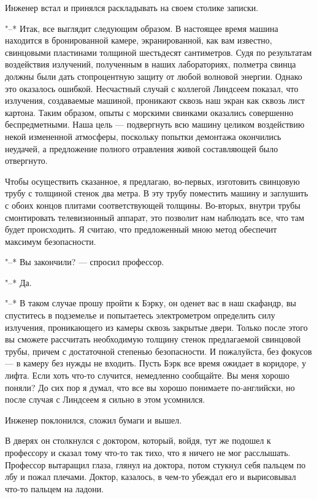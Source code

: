Инженер встал и принялся раскладывать на своем столике записки.

"--* Итак, все  выглядит  следующим  образом.  В  настоящее  время  машина
находится  в  бронированной  камере,  экранированной,  как  вам  известно,
свинцовыми пластинами толщиной шестьдесят сантиметров. Судя по результатам
воздействия излучений, полученным в наших  лабораториях,  полметра  свинца
должны были дать стопроцентную защиту от любой  волновой  энергии.  Однако
это оказалось ошибкой. Несчастный случай с коллегой Линдсеем показал,  что
излучения, создаваемые машиной, проникают сквозь наш экран как сквозь лист
картона. Таким образом, опыты с  морскими  свинками  оказались  совершенно
беспредметными. Наша цель --- подвергнуть  всю  машину  целиком  воздействию
некой  измененной  атмосферы,  поскольку  попытки   демонтажа   окончились
неудачей,  а  предложение  полного  отравления  живой  составляющей   было
отвергнуто.

Чтобы  осуществить  сказанное,  я  предлагаю,   во-первых,   изготовить
свинцовую трубу с толщиной стенок два метра. В эту трубу поместить  машину
и заглушить с обоих концов  плитами  соответствующей  толщины.  Во-вторых,
внутри  трубы  смонтировать  телевизионный  аппарат,  это   позволит   нам
наблюдать все, что там будет происходить. Я считаю, что предложенный  мною
метод обеспечит максимум безопасности.

"--* Вы закончили? --- спросил профессор.

"--* Да.

"--* В таком случае прошу пройти к Бэрку, он оденет вас в наш скафандр, вы
спуститесь  в  подземелье  и  попытаетесь  электрометром  определить  силу
излучения, проникающего из камеры  сквозь  закрытые  двери.  Только  после
этого  вы  сможете  рассчитать  необходимую  толщину  стенок  предлагаемой
свинцовой трубы, причем с достаточной степенью безопасности. И пожалуйста,
без фокусов --- в камеру без нужды не входить. Пусть Бэрк все время  ожидает
в коридоре, у лифта. Если хоть что-то случится, немедленно  сообщайте.  Вы
меня хорошо поняли? До сих пор  я  думал,  что  все  вы  хорошо  понимаете
по-английски, но после случая с Линдсеем я сильно в этом усомнился.

Инженер поклонился, сложил бумаги и вышел.

В дверях он столкнулся с доктором, который, войдя,  тут  же  подошел  к
профессору и сказал тому что-то так тихо, что я ничего не мог  расслышать.
Профессор вытаращил глаза, глянул на доктора, потом стукнул  себя  пальцем
по лбу  и  пожал  плечами.  Доктор,  казалось,  в  чем-то  убеждал  его  и
вырисовывал что-то пальцем на ладони.

